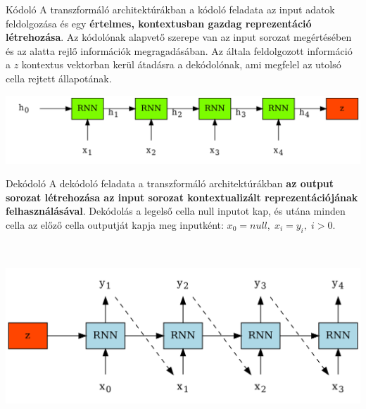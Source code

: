 \documentclass[english, aspectratio=169]{beamer}
\begin{document}
\begin{frame}{Kódoló}
A transzformáló architektúrákban a kódoló feladata az input adatok feldolgozása és egy \textbf{értelmes, kontextusban gazdag reprezentáció létrehozása}. Az kódolónak alapvető szerepe van az input sorozat megértésében és az alatta rejlő információk megragadásában. Az általa feldolgozott információ a $z$ kontextus vektorban kerül átadásra a dekódolónak, ami megfelel az utolsó cella rejtett állapotának.\par\medskip
\begin{center}
\includegraphics[width=14cm, keepaspectratio]{graphs/transformer_3.png}
\end{center}
\end{frame}

\begin{frame}{Dekódoló}
A dekódoló feladata a transzformáló architektúrákban \textbf{az output sorozat létrehozása az input sorozat kontextualizált reprezentációjának felhasználásával}. Dekódolás a legelső cella null inputot kap, és utána minden cella az előző cella outputját kapja meg inputként: $x_0 = null,\; x_i = y_i,\; i>0$. 
\begin{center}
\includegraphics[width=14cm, height=7cm, keepaspectratio]{graphs/transformer_4.png}
\end{center}
\end{frame}
\end{document}
